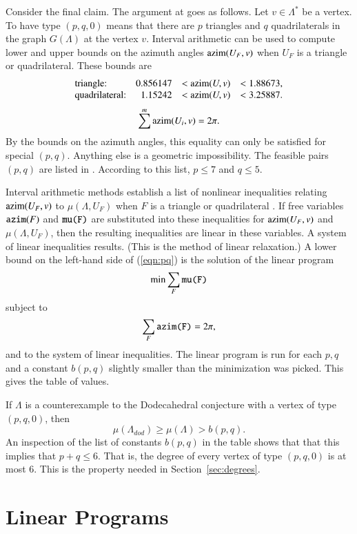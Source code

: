 \documentclass{article} %
\begin{document}
Consider the final claim.  
The argument at \cite[p.14]{Hales:2002:Dodec} goes as follows.
Let $v\in\Lambda^*$ be a vertex.
To have type $(p,q,0)$ means that there are $p$ triangles and $q$ quadrilaterals
in the graph $G(\Lambda)$ at the vertex $v$.
Interval arithmetic can be used to compute lower and upper bounds on the
azimuth angles ${\operatorname{azim}}(U_F,v)$ when $U_F$ is a triangle or quadrilateral.
These bounds are \cite[F.2.1,F.4]{Hales:2002:Dodec}
$$
\begin{array}{lrlll}
\text{triangle:} &  0.856147 &< {\operatorname{azim}}(U,v) &< 1.88673,\\
\text{quadrilateral:} & 1.15242 &< {\operatorname{azim}}(U,v) &< 3.25887.\\
\end{array}
$$
\begin{equation}\label{eqn:2pi}
\sum^m {\operatorname{azim}}(U_i,v) = 2\pi.
\end{equation}
By the bounds on the azimuth angles, this equality can only be satisfied for
special $(p,q)$. Anything else is a geometric impossibility.  The feasible pairs $(p,q)$
are listed in \cite[Lemma~6.1]{Hales:2002:Dodec}.  According to this list, $p\le 7$ and $q\le 5$.

Interval arithmetic methods establish a list of nonlinear inequalities
relating ${\operatorname{azim}}(U_F,v)$ to $\mu(\Lambda,U_F)$ when $F$ is a
triangle or quadrilateral \cite{McLaughlin:2008:KeplerCode}. If free variables
${\operatorname{{\texttt{azim}}}}(F)$ and ${\operatorname{{\texttt{mu(F)}}}}$ are substituted into these
inequalities for ${\operatorname{azim}}(U_F,v)$ and $\mu(\Lambda,U_F)$, then the
resulting inequalities are linear in these variables. A system of
linear inequalities results. (This is the method of linear
relaxation.) A lower bound on the left-hand side of (\ref{eqn:pq}) is
the solution of the linear program
$$
\min \sum_F {\operatorname{{\texttt{mu(F)}}}}
$$
subject to 
$$
\sum_F {\operatorname{{\texttt{azim(F)}}}} = 2\pi,
$$
and to the system of linear inequalities.  The linear program is run for
each $p,q$ and a constant $b(p,q)$ slightly smaller than the minimization was picked.
This gives the table of values.

If $\Lambda$ is a counterexample to the Dodecahedral conjecture with a vertex
of type $(p,q,0)$, then
$$\mu(\Lambda_{dod}) \ge \mu(\Lambda) > b(p,q).$$
An inspection of the list of constants $b(p,q)$ in the table shows that that this implies
that $p+q\le 6$.  That is, the degree of every vertex of type $(p,q,0)$
is at most $6$.  This
is the property needed in Section~\ref{sec:degrees}.


\section{Linear Programs}
\label{sec:linear-programs}
\end{document}

